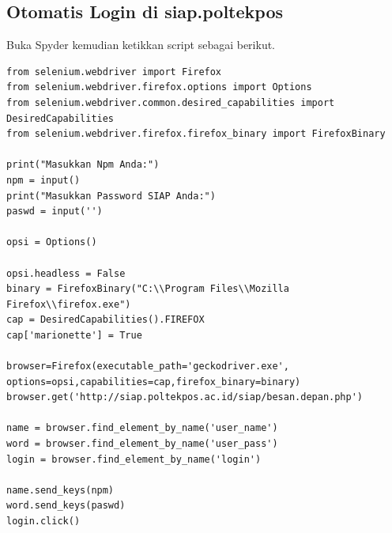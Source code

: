 \subsection{Otomatis Login di siap.poltekpos}
Buka Spyder kemudian ketikkan script sebagai berikut.
\begin{verbatim}
from selenium.webdriver import Firefox
from selenium.webdriver.firefox.options import Options
from selenium.webdriver.common.desired_capabilities import DesiredCapabilities
from selenium.webdriver.firefox.firefox_binary import FirefoxBinary

print("Masukkan Npm Anda:")
npm = input()
print("Masukkan Password SIAP Anda:")
paswd = input('')

opsi = Options()

opsi.headless = False
binary = FirefoxBinary("C:\\Program Files\\Mozilla Firefox\\firefox.exe")
cap = DesiredCapabilities().FIREFOX
cap['marionette'] = True

browser=Firefox(executable_path='geckodriver.exe',
options=opsi,capabilities=cap,firefox_binary=binary)
browser.get('http://siap.poltekpos.ac.id/siap/besan.depan.php')

name = browser.find_element_by_name('user_name')
word = browser.find_element_by_name('user_pass')
login = browser.find_element_by_name('login')

name.send_keys(npm)
word.send_keys(paswd)
login.click()
\end{verbatim}

